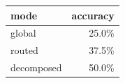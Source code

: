\begin{tabular}{lr}
\toprule
mode & accuracy \\
\midrule
global & 25.0\% \\
routed & 37.5\% \\
decomposed & 50.0\% \\
\bottomrule
\end{tabular}
